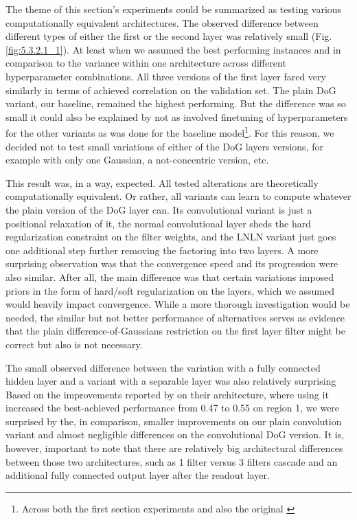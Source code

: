 The theme of this section’s experiments could be summarized as testing various computationally equivalent architectures. The observed difference between different types of either the first or the second layer was relatively small (Fig. \ref{fig:5.3.2.1_1}). At least when we assumed the best performing instances and in comparison to the variance within one architecture across different hyperparameter combinations. All three versions of the first layer fared very similarly in terms of achieved correlation on the validation set. The plain DoG variant, our baseline, remained the highest performing. But the difference was so small it could also be explained by not as involved finetuning of hyperparameters for the other variants as was done for the baseline model\footnote{Across both the first section experiments and also the original \cite{antolik}}. For this reason, we decided not to test small variations of either of the DoG layers versions, for example with only one Gaussian, a not-concentric version, etc. 

This result was, in a way, expected. All tested alterations are theoretically computationally equivalent. Or rather, all variants can learn to compute whatever the plain version of the DoG layer can. Its convolutional variant is just a positional relaxation of it, the normal convolutional layer sheds the hard regularization constraint on the filter weights, and the LNLN variant just goes one additional step further removing the factoring into two layers. A more surprising observation was that the convergence speed and its progression were also similar. After all, the main difference was that certain variations imposed priors in the form of hard/soft regularization on the layers, which we assumed would heavily impact convergence. While a more thorough investigation would be needed, the similar but not better performance of alternatives serves as evidence that the plain difference-of-Gaussians restriction on the first layer filter might be correct but also is not necessary.

The small observed difference between the variation with a fully connected hidden layer and a variant with a separable layer was also relatively surprising Based on the improvements reported by \cite{klidnt} on their architecture, where using it increased the best-achieved performance from 0.47 to 0.55 on region 1, we were surprised by the, in comparison, smaller improvements on our plain convolution variant and almost negligible differences on the convolutional DoG version. It is, however, important to note that there are relatively big architectural differences between those two architectures, such as 1 filter versus 3 filters cascade and an additional fully connected output layer after the readout layer.

